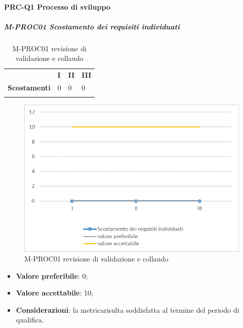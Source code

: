 \paragraph*{PRC-Q1 Processo di sviluppo}
\subparagraph{M-PROC01 Scostamento dei requisiti individuati} \mbox{}
\begin{longtable}[H!] {						
		>{}p{50mm}  		
		>{}p{8mm}
		>{}p{8mm}		
		>{}p{8mm}		
	}
	\rowcolor{gray!50}
	\textbf{} & \textbf{I} & \textbf{II} & \textbf{III}  \TBstrut \\ [2mm]
	\textbf{Scostamenti} & 0 & 0 & 0 \TBstrut \\ [2mm]
	\rowcolor{white}
	\caption{M-PROC01 revisione di validazione e collaudo}
\end{longtable}
\begin{figure}[H] 	
	\includegraphics[width=\linewidth]{./img/grafici/RA1.png}	
	\caption{M-PROC01 revisione di validazione e collaudo}	
\end{figure}
\begin{itemize}
	\item \textbf{Valore preferibile}: 0;
	\item \textbf{Valore accettabile}: 10;
	\item \textbf{Considerazioni}: la metrica\glosp risulta soddisfatta al termine del periodo di qualifica.
\end{itemize}

